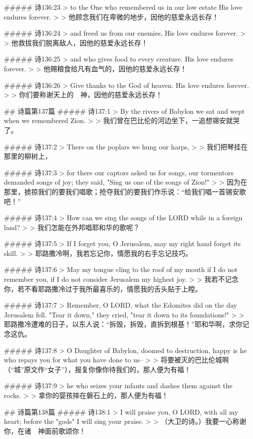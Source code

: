 ##### 诗136:23
> to the One who remembered us in our low estate His love endures forever.
>
> 他顾念我们在卑微的地步，因他的慈爱永远长存！


##### 诗136:24
> and freed us from our enemies, His love endures forever.
>
> 他救拔我们脱离敌人，因他的慈爱永远长存！


##### 诗136:25
> and who gives food to every creature. His love endures forever.
>
> 他赐粮食给凡有血气的，因他的慈爱永远长存！


##### 诗136:26
> Give thanks to the God of heaven. His love endures forever.
>
> 你们要称谢天上的　神，因他的慈爱永远长存！


## 诗篇第137篇
##### 诗137:1
> By the rivers of Babylon we sat and wept when we remembered Zion.
>
> 我们曾在巴比伦的河边坐下，一追想锡安就哭了。


##### 诗137:2
> There on the poplars we hung our harps,
>
> 我们把琴挂在那里的柳树上，


##### 诗137:3
> for there our captors asked us for songs, our tormentors demanded songs of joy; they said, "Sing us one of the songs of Zion!"
>
> 因为在那里，掳掠我们的要我们唱歌；抢夺我们的要我们作乐说：“给我们唱一首锡安歌吧！”


##### 诗137:4
> How can we sing the songs of the LORD while in a foreign land?
>
> 我们怎能在外邦唱耶和华的歌呢？


##### 诗137:5
> If I forget you, O Jerusalem, may my right hand forget its skill.
>
> 耶路撒冷啊，我若忘记你，情愿我的右手忘记技巧。


##### 诗137:6
> May my tongue cling to the roof of my mouth if I do not remember you, if I do not consider Jerusalem my highest joy.
>
> 我若不记念你，若不看耶路撒冷过于我所最喜乐的，情愿我的舌头贴于上瞠。


##### 诗137:7
> Remember, O LORD, what the Edomites did on the day Jerusalem fell. "Tear it down," they cried, "tear it down to its foundations!"
>
> 耶路撒冷遭难的日子，以东人说：“拆毁，拆毁，直拆到根基！”耶和华啊，求你记念这仇。


##### 诗137:8
> O Daughter of Babylon, doomed to destruction, happy is he who repays you for what you have done to us--
>
> 将要被灭的巴比伦城啊（“城”原文作“女子”），报复你像你待我们的，那人便为有福！


##### 诗137:9
> he who seizes your infants and dashes them against the rocks.
>
> 拿你的婴孩摔在磐石上的，那人便为有福！


## 诗篇第138篇
##### 诗138:1
> I will praise you, O LORD, with all my heart; before the "gods" I will sing your praise.
>
> （大卫的诗。）我要一心称谢你，在诸　神面前歌颂你！


